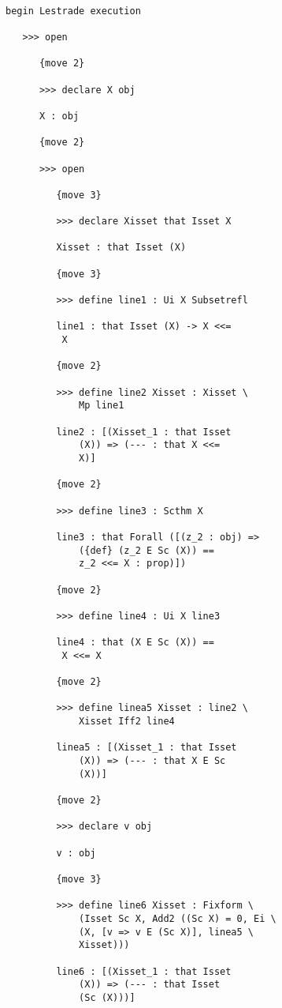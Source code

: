 \documentclass[12pt]{article}
\begin{document}
\begin{verbatim}

begin Lestrade execution

   >>> open

      {move 2}

      >>> declare X obj

      X : obj

      {move 2}

      >>> open

         {move 3}

         >>> declare Xisset that Isset X

         Xisset : that Isset (X)

         {move 3}

         >>> define line1 : Ui X Subsetrefl

         line1 : that Isset (X) -> X <<= 
          X

         {move 2}

         >>> define line2 Xisset : Xisset \
             Mp line1

         line2 : [(Xisset_1 : that Isset 
             (X)) => (--- : that X <<= 
             X)]

         {move 2}

         >>> define line3 : Scthm X

         line3 : that Forall ([(z_2 : obj) => 
             ({def} (z_2 E Sc (X)) == 
             z_2 <<= X : prop)])

         {move 2}

         >>> define line4 : Ui X line3

         line4 : that (X E Sc (X)) == 
          X <<= X

         {move 2}

         >>> define linea5 Xisset : line2 \
             Xisset Iff2 line4

         linea5 : [(Xisset_1 : that Isset 
             (X)) => (--- : that X E Sc 
             (X))]

         {move 2}

         >>> declare v obj

         v : obj

         {move 3}

         >>> define line6 Xisset : Fixform \
             (Isset Sc X, Add2 ((Sc X) = 0, Ei \
             (X, [v => v E (Sc X)], linea5 \
             Xisset)))

         line6 : [(Xisset_1 : that Isset 
             (X)) => (--- : that Isset 
             (Sc (X)))]


\end{verbatim}
\end{document}
